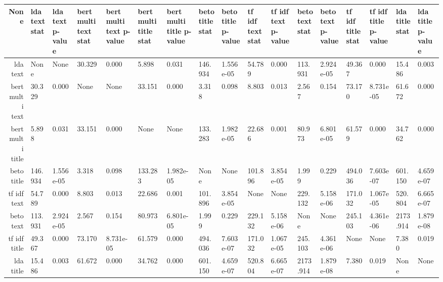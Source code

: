 \begin{tabular}{|r|l|l|l|l|l|l|l|l|l|l|l|l|l|l|l|l|}
  \hline
  None & lda text stat & lda text p-value & bert multi text stat & bert multi text p-value & bert multi title stat & bert multi title p-value & beto title stat & beto title p-value & tf idf text stat & tf idf text p-value & beto text stat & beto text p-value & tf idf title stat & tf idf title p-value & lda title stat & lda title p-value \\ 
  \hline
  lda text & None & None & 30.329 & 0.000 & 5.898 & 0.031 & 146.934 & 1.556e-05 & 54.789 & 0.000 & 113.931 & 2.924e-05 & 49.367 & 0.000 & 15.486 & 0.003 \\ 
  \hline
  bert multi text & 30.329 & 0.000 & None & None & 33.151 & 0.000 & 3.318 & 0.098 & 8.803 & 0.013 & 2.567 & 0.154 & 73.170 & 8.731e-05 & 61.672 & 0.000 \\ 
  \hline
  bert multi title & 5.898 & 0.031 & 33.151 & 0.000 & None & None & 133.283 & 1.982e-05 & 22.686 & 0.001 & 80.973 & 6.801e-05 & 61.579 & 0.000 & 34.762 & 0.000 \\ 
  \hline
  beto title & 146.934 & 1.556e-05 & 3.318 & 0.098 & 133.283 & 1.982e-05 & None & None & 101.896 & 3.854e-05 & 1.999 & 0.229 & 494.036 & 7.603e-07 & 601.150 & 4.659e-07 \\ 
  \hline
  tf idf text & 54.789 & 0.000 & 8.803 & 0.013 & 22.686 & 0.001 & 101.896 & 3.854e-05 & None & None & 229.132 & 5.158e-06 & 171.032 & 1.067e-05 & 520.804 & 6.665e-07 \\ 
  \hline
  beto text & 113.931 & 2.924e-05 & 2.567 & 0.154 & 80.973 & 6.801e-05 & 1.999 & 0.229 & 229.132 & 5.158e-06 & None & None & 245.103 & 4.361e-06 & 2173.914 & 1.879e-08 \\ 
  \hline
  tf idf title & 49.367 & 0.000 & 73.170 & 8.731e-05 & 61.579 & 0.000 & 494.036 & 7.603e-07 & 171.032 & 1.067e-05 & 245.103 & 4.361e-06 & None & None & 7.380 & 0.019 \\ 
  \hline
  lda title & 15.486 & 0.003 & 61.672 & 0.000 & 34.762 & 0.000 & 601.150 & 4.659e-07 & 520.804 & 6.665e-07 & 2173.914 & 1.879e-08 & 7.380 & 0.019 & None & None \\ 
  \hline
\end{tabular}
